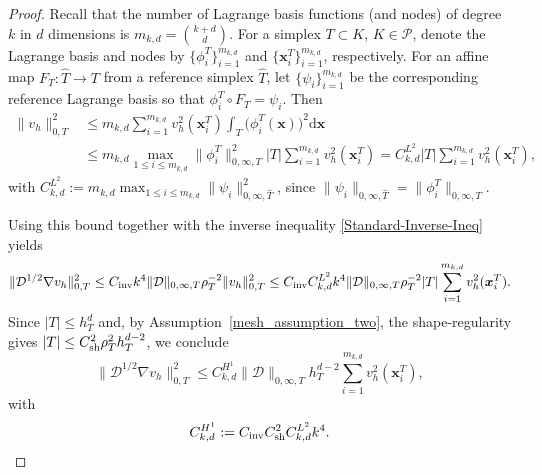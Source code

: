 \documentclass[11pt,final]{amsart}
\theoremstyle{plain}
\theoremstyle{definition}
\newcommand\bx{\boldsymbol{x}}
\newcommand\calP{{\mathcal{P}}}
\begin{document}
\begin{proof}
Recall that the number of Lagrange basis functions (and nodes) of
degree $k$ in $d$ dimensions is $m_{k,d}=\binom{k+d}{d}$. For a simplex
$T\subset K$, $K\in\calP$, denote the Lagrange basis and nodes by
$\{\phi_i^T\}_{i=1}^{m_{k,d}}$ and $\{\bx_i^T\}_{i=1}^{m_{k,d}}$,
respectively. For an affine map $F_T:\hat T\to T$ from a reference
simplex $\hat T$, let $\{\psi_i\}_{i=1}^{m_{k,d}}$ be the corresponding
reference Lagrange basis so that $\phi_i^T\circ F_T=\psi_i$. Then
\[
\begin{aligned}
\|v_h\|_{0,T}^2
&\le m_{k,d}\sum_{i=1}^{m_{k,d}} v_h^2(\bx_i^T)\int_T \big(\phi_i^T(\bx)\big)^2 \mathrm{d}\bx\\
&\le m_{k,d} \max_{1\le i\le m_{k,d}}\|\phi_i^T\|_{0,\infty,T}^2 |T| 
   \sum_{i=1}^{m_{k,d}} v_h^2(\bx_i^T)
   =  C_{k,d}^{L^2} |T| \sum_{i=1}^{m_{k,d}} v_h^2(\bx_i^T),
\end{aligned}
\]
with $C_{k,d}^{L^2}:= m_{k,d} \max_{1\le i\le m_{k,d}}\|\psi_i\|_{0,\infty,\hat T}^2$,
since $\|\psi_i\|_{0,\infty,\hat T}=\|\phi_i^T\|_{0,\infty,T}$.

Using this bound together with the inverse inequality
\eqref{Standard-Inverse-Ineq} yields
\[
\|\mathcal{D}^{1/2}\nabla v_h\|_{0,T}^2
 \le  C_{\rm inv} k^4 \|\mathcal{D}\|_{0,\infty,T} \rho_T^{-2} \|v_h\|_{0,T}^2
 \le  C_{\rm inv} C_{k,d}^{L^2} k^4 \|\mathcal{D}\|_{0,\infty,T} \rho_T^{-2} |T|
        \sum_{i=1}^{m_{k,d}} v_h^2(\bx_i^T).
\]
Since $|T|\le h_T^d$ and, by Assumption~\ref{mesh_assumption_two}, the
shape-regularity gives $|T| \le C_{\rm sh}^2 \rho_T^2 h_T^{d-2}$, we conclude
\begin{equation}\label{H^1_stab}
  \|\mathcal{D}^{1/2}\nabla v_h\|_{0,T}^2
   \le  C_{k,d}^{H^1} \|\mathcal{D}\|_{0,\infty,T} h_T^{d-2}
          \sum_{i=1}^{m_{k,d}} v_h^2(\bx_i^T),
\end{equation}
with
\[
C_{k,d}^{H^1}:= C_{\rm inv} C_{\rm sh}^2 C_{k,d}^{L^2} k^4.
\]


\end{proof}
\end{document}
